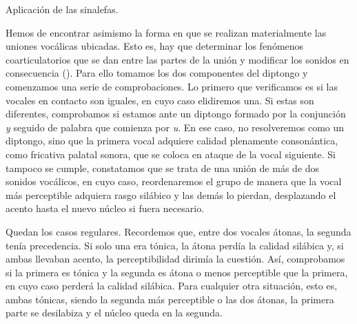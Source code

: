 \begin{algorithm}[!ht]
	\caption{Aplicación de las sinalefas.}\label{list:VerSeMetre6}
\end{algorithm} 

Hemos de encontrar asimismo la forma en que se realizan materialmente las uniones vocálicas ubicadas. Esto es, hay que determinar los fenómenos coarticulatorios que se dan entre las partes de la unión y modificar los sonidos en consecuencia  (). Para ello tomamos los dos componentes del diptongo y comenzamos una serie de comprobaciones. Lo primero que verificamos es si las vocales en contacto son iguales, en cuyo caso elidiremos una. Si  estas son diferentes, comprobamos si estamos ante un diptongo formado por la conjunción \textit{y} seguido de palabra que comienza por \textit{u}. En ese caso, no resolveremos como un diptongo, sino que la primera vocal adquiere calidad plenamente consonántica, como fricativa palatal sonora, que se coloca en ataque de la vocal siguiente. Si tampoco se cumple, constatamos que se trata de una unión de más de dos sonidos vocálicos, en cuyo caso, reordenaremos el grupo de manera que la vocal más perceptible adquiera rasgo silábico y las demás lo pierdan, desplazando el acento hasta el nuevo núcleo si fuera necesario.

Quedan los casos regulares. Recordemos que, entre dos vocales átonas, la segunda tenía precedencia. Si solo una era tónica, la átona perdía la calidad silábica y, si ambas llevaban acento, la perceptibilidad dirimía la cuestión. Así, comprobamos si la primera es tónica y la segunda es átona o menos perceptible que la primera, en cuyo caso perderá la calidad silábica. Para cualquier otra situación, esto es, ambas tónicas, siendo la segunda más perceptible o las dos átonas, la primera parte se desilabiza y el núcleo queda en la segunda.

